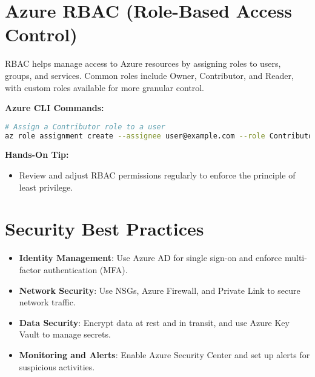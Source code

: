 \documentclass{article}
\begin{document}
\section{Azure RBAC (Role-Based Access Control)}
RBAC helps manage access to Azure resources by assigning roles to users, groups, and services. Common roles include Owner, Contributor, and Reader, with custom roles available for more granular control.

\textbf{Azure CLI Commands:}
\begin{lstlisting}[language=bash]
# Assign a Contributor role to a user
az role assignment create --assignee user@example.com --role Contributor --scope /subscriptions/<subscription-id>/resourceGroups/MyResourceGroup
\end{lstlisting}

\textbf{Hands-On Tip:}
\begin{itemize}
    \item Review and adjust RBAC permissions regularly to enforce the principle of least privilege.
\end{itemize}

\section{Security Best Practices}
\begin{itemize}
    \item \textbf{Identity Management}: Use Azure AD for single sign-on and enforce multi-factor authentication (MFA).
    \item \textbf{Network Security}: Use NSGs, Azure Firewall, and Private Link to secure network traffic.
    \item \textbf{Data Security}: Encrypt data at rest and in transit, and use Azure Key Vault to manage secrets.
    \item \textbf{Monitoring and Alerts}: Enable Azure Security Center and set up alerts for suspicious activities.
\end{itemize}
\end{document}
